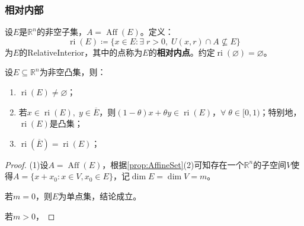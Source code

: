 \subsubsection{相对内部}
\begin{definition}
	设$E$是$\mathbb{R}^{n}$的非空子集，$A=\operatorname{Aff}(E)$。定义：
	\begin{equation*}
		\operatorname{ri}(E)\coloneq\{x\in E:\exists\;r>0,\;U(x,r)\cap A\nsubseteq E\}
	\end{equation*}
	为$E$的\gls{RelativeInterior}，其中的点称为$E$的\textbf{相对内点}。约定$\operatorname{ri}(\varnothing)=\varnothing$。
\end{definition}
\begin{property}\label{prop:RelativeInterior}
	设$E\subseteq\mathbb{R}^{n}$为非空凸集，则：
	\begin{enumerate}
		\item $\operatorname{ri}(E)\ne\varnothing$；
		\item 若$x\in\operatorname{ri}(E),\;y\in\overline{E}$，则$(1-\theta)x+\theta y\in\operatorname{ri}(E)$，$\forall\;\theta\in[0,1)$；特别地，$\operatorname{ri}(E)$是凸集；
		\item $\operatorname{ri}(\overline{E})=\operatorname{ri}(E)$；
	\end{enumerate}
\end{property}
\begin{proof}
	(1)设$A=\operatorname{Aff}(E)$，根据\cref{prop:AffineSet}(2)可知存在一个$\mathbb{R}^{n}$的子空间$V$使得$A=\{x+x_0:x\in V,x_0\in E\}$，记$\dim E=\dim V=m$。\par
	若$m=0$，则$E$为单点集，结论成立。\par
	若$m>0$，
\end{proof}
